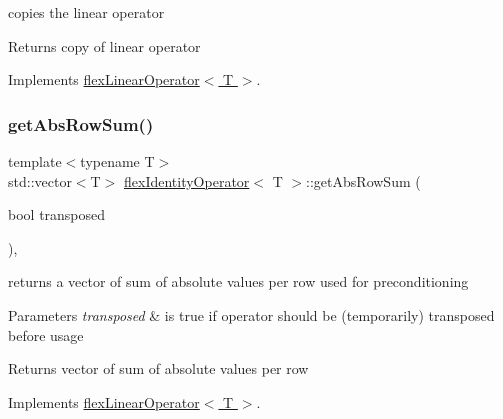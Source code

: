 copies the linear operator 

\begin{DoxyReturn}{Returns}
copy of linear operator 
\end{DoxyReturn}


Implements \hyperlink{classflex_linear_operator_a7cc1425677cc30fcbd092ffd28d508c9}{flex\+Linear\+Operator$<$ T $>$}.

\mbox{\label{classflex_identity_operator_afe7f2f91fc5f563c2261937f272c0255}} 
\subsubsection{\texorpdfstring{get\+Abs\+Row\+Sum()}{getAbsRowSum()}}
{\footnotesize\ttfamily template$<$typename T$>$ \\
std\+::vector$<$T$>$ \hyperlink{classflex_identity_operator}{flex\+Identity\+Operator}$<$ T $>$\+::get\+Abs\+Row\+Sum (\begin{DoxyParamCaption}\item[{bool}]{transposed }\end{DoxyParamCaption})\hspace{0.3cm}{\ttfamily [inline]}, {\ttfamily [virtual]}}



returns a vector of sum of absolute values per row used for preconditioning 


\begin{DoxyParams}{Parameters}
{\em transposed} & is true if operator should be (temporarily) transposed before usage \\
\hline
\end{DoxyParams}
\begin{DoxyReturn}{Returns}
vector of sum of absolute values per row 
\end{DoxyReturn}


Implements \hyperlink{classflex_linear_operator_ad6caa7b09e6e3c401cadef61b8e2307e}{flex\+Linear\+Operator$<$ T $>$}.

\mbox{\label{classflex_identity_operator_ae12ebab61f7f39b0d1f636ad1d27c77a}} 
